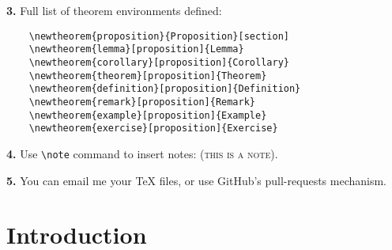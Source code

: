 \documentclass[letterpaper,11pt,oneside,reqno]{amsart}
\numberwithin{equation}{section}%
\newcommand{\note}[1]{\textsc{\color{blue}(#1)}}
\theoremstyle{definition}
\begin{document}
\textbf{3.} Full list of theorem environments defined:
\begin{lstlisting}
	\newtheorem{proposition}{Proposition}[section]
	\newtheorem{lemma}[proposition]{Lemma}
	\newtheorem{corollary}[proposition]{Corollary}
	\newtheorem{theorem}[proposition]{Theorem}
	\newtheorem{definition}[proposition]{Definition}
	\newtheorem{remark}[proposition]{Remark}
	\newtheorem{example}[proposition]{Example}
	\newtheorem{exercise}[proposition]{Exercise}	
\end{lstlisting}

\textbf{4.} Use \lstinline{\note} command to insert notes: \note{this is a note}.

\textbf{5.} You can email me your \TeX{} files, or use GitHub's pull-requests mechanism.

\section{Introduction} %
\label{sec:introduction}










\end{document}
